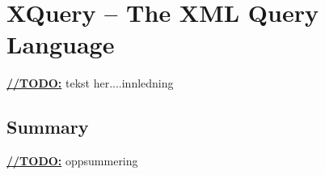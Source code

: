 \chapter{XQuery -- The XML Query Language}
\underline{\textbf{\LARGE //TODO:}} tekst her....innledning


%
%


\section{Summary}
\underline{\textbf{\LARGE //TODO:}} oppsummering